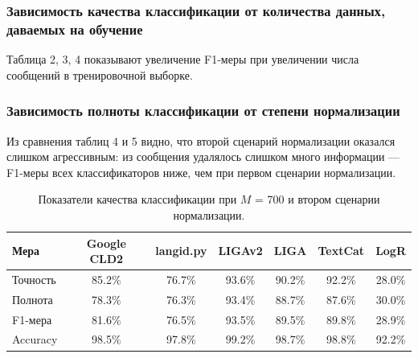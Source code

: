 \documentclass[a4paper, 14pt]{article}
\begin{document}
		\subsubsection{Зависимость качества классификации от количества данных, даваемых на обучение}
		Таблица 2, 3, 4 показывают увеличение F1-меры при увеличении числа сообщений в тренировочной выборке.
		
		\subsubsection{Зависимость полноты классификации от степени нормализации}
		Из сравнения таблиц 4 и 5 видно, что второй сценарий нормализации оказался слишком агрессивным: из сообщения удалялось слишком много информации --- F1-меры всех классификаторов ниже, чем при первом сценарии нормализации. 




\begin{center}
\begin{table}
\begin{tabular*}{0.954\textwidth}{| l| *{6}{|c} |}
\hline 
Мера & Google CLD2 & langid.py & LIGAv2 & LIGA & TextCat  & LogR\\
\hline
Точность & 85.2\% & 76.7\% & 93.6\% & 90.2\% & 92.2\% & 28.0\%\\
Полнота & 78.3\% & 76.3\% & 93.4\% & 88.7\% & 87.6\% & 30.0\%\\
F1-мера & 81.6\% & 76.5\% & 93.5\% & 89.5\% & 89.8\% & 28.9\%\\
Accuracy & 98.5\% & 97.8\% & 99.2\% & 98.7\% & 98.8\% & 92.2\%\\
\hline
\end{tabular*}
\caption{Показатели качества классификации при $M$ = 700 и втором сценарии нормализации.}
\end{table}
\end{center}
\end{document}
